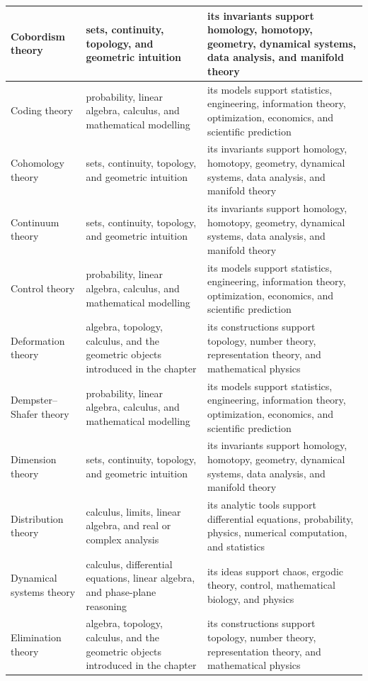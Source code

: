\documentclass[11pt,oneside]{book}
\begin{document}
\begin{longtable}{>{\raggedright\arraybackslash}p{}>{\raggedright\arraybackslash}p{}>{\raggedright\arraybackslash}p{}}
\hline
Cobordism theory & sets, continuity, topology, and geometric intuition & its invariants support homology, homotopy, geometry, dynamical systems, data analysis, and manifold theory\\
\hline
Coding theory & probability, linear algebra, calculus, and mathematical modelling & its models support statistics, engineering, information theory, optimization, economics, and scientific prediction\\
\hline
Cohomology theory & sets, continuity, topology, and geometric intuition & its invariants support homology, homotopy, geometry, dynamical systems, data analysis, and manifold theory\\
\hline
Continuum theory & sets, continuity, topology, and geometric intuition & its invariants support homology, homotopy, geometry, dynamical systems, data analysis, and manifold theory\\
\hline
Control theory & probability, linear algebra, calculus, and mathematical modelling & its models support statistics, engineering, information theory, optimization, economics, and scientific prediction\\
\hline
Deformation theory & algebra, topology, calculus, and the geometric objects introduced in the chapter & its constructions support topology, number theory, representation theory, and mathematical physics\\
\hline
Dempster--Shafer theory & probability, linear algebra, calculus, and mathematical modelling & its models support statistics, engineering, information theory, optimization, economics, and scientific prediction\\
\hline
Dimension theory & sets, continuity, topology, and geometric intuition & its invariants support homology, homotopy, geometry, dynamical systems, data analysis, and manifold theory\\
\hline
Distribution theory & calculus, limits, linear algebra, and real or complex analysis & its analytic tools support differential equations, probability, physics, numerical computation, and statistics\\
\hline
Dynamical systems theory & calculus, differential equations, linear algebra, and phase-plane reasoning & its ideas support chaos, ergodic theory, control, mathematical biology, and physics\\
\hline
Elimination theory & algebra, topology, calculus, and the geometric objects introduced in the chapter & its constructions support topology, number theory, representation theory, and mathematical physics\\

\end{longtable}
\end{document}
